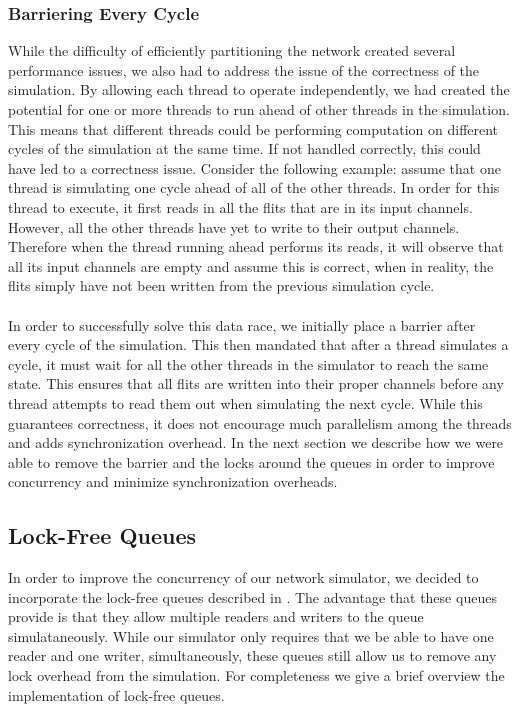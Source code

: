 \documentclass{article}
\begin{document}
\begin{multicols}{2}
\subsubsection{Barriering Every Cycle}
While the difficulty of efficiently partitioning the network created
several performance issues, we also had to address the issue of the
correctness of the simulation.  By allowing each thread to operate
independently, we had created the potential for one or more threads to run
ahead of other threads in the simulation.  This means that different
threads could be performing computation on different cycles of the
simulation at the same time.  If not handled correctly, this could have
led to a correctness issue.  Consider the following example: assume that
one thread is simulating one cycle ahead of all of the other threads.  In
order for this thread to execute, it first reads in all the flits that are
in its input channels.  However, all the other threads have yet to write
to their output channels.  Therefore when the thread running ahead
performs its reads, it will observe that all its input channels are empty
and assume this is correct, when in reality, the flits simply have not
been written from the previous simulation cycle.\\
~\\
In order to successfully solve this data race, we initially place a
barrier after every cycle of the simulation.  This then mandated that
after a thread simulates a cycle, it must wait for all the other threads
in the simulator to reach the same state.  This ensures that all flits are
written into their proper channels before any thread attempts to read them
out when simulating the next cycle.  While this guarantees correctness, it
does not encourage much parallelism among the threads and adds
synchronization overhead.  In the next section we describe how we were
able to remove the barrier and the locks around the queues in order to
improve concurrency and minimize synchronization overheads.

\subsection{Lock-Free Queues}
In order to improve the concurrency of our network simulator, we decided
to incorporate the lock-free queues described in \cite{LF}.  The advantage
that these queues provide is that they allow multiple readers and writers
to the queue simulataneously.  While our simulator only requires that we
be able to have one reader and one writer, simultaneously, these queues
still allow us to remove any lock overhead from the simulation.  For
completeness we give a brief overview the implementation of lock-free
queues.


\end{multicols}
\end{document}
